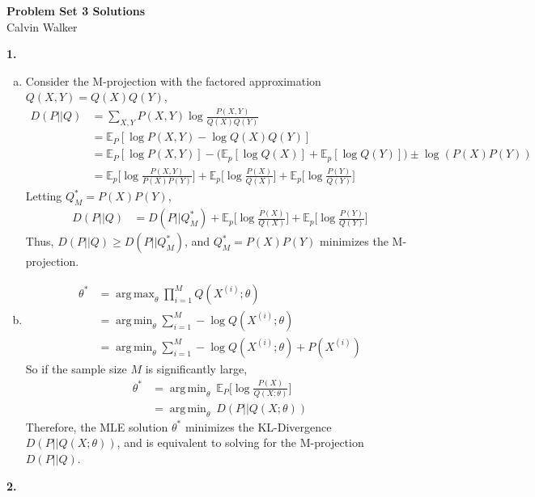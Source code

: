 \documentclass{article}
\DeclareMathOperator*{\argmax}{arg\,max}
\DeclareMathOperator*{\argmin}{arg\,min}
\begin{document}
\begin{center}
    \Large{\textbf{Problem Set 3 Solutions}} \\[0.25ex]
    Calvin Walker
\end{center}
\textbf{1.}
\begin{enumerate}[(a)]
    \item Consider the M-projection with the factored approximation $Q(X, Y) = Q(X)Q(Y)$, \begin{align*}
        D(P || Q) &= \sum_{X, Y} P(X, Y) \log \frac{P(X, Y)}{Q(X)Q(Y)} \\[0.5ex]
        &= \mathbb{E}_P[\log P(X, Y) - \log Q(X)Q(Y)] \\[0.5ex]
        &= \mathbb{E}_P[\log P(X, Y)] - \bigg(\mathbb{E}_p[\log Q(X)] + \mathbb{E}_p[\log Q(Y)]\bigg) \pm \log(P(X)P(Y)) \\[0.5ex]
        &= \mathbb{E}_p \bigg[\log \frac{P(X, Y)}{P(X)P(Y)}\bigg] + \mathbb{E}_p \bigg[\log \frac{P(X)}{Q(X)}\bigg] + \mathbb{E}_p \bigg[\log \frac{P(Y)}{Q(Y)}\bigg]
    \end{align*}
    Letting $Q^*_M = P(X)P(Y)$, \begin{align*}
        D(P || Q) &= D(P || Q^*_M) + \mathbb{E}_p \bigg[\log \frac{P(X)}{Q(X)}\bigg] + \mathbb{E}_p \bigg[\log \frac{P(Y)}{Q(Y)}\bigg]
    \end{align*}
    Thus, $D(P || Q) \geq D(P || Q^*_M)$, and $Q^*_M = P(X)P(Y)$ minimizes the M-projection. 
    \item \begin{align*}
        \theta^* &= \argmax_\theta \prod_{i = 1}^{M}Q(X^{(i)} ; \theta) \\[0.5ex]
        &= \argmin_\theta \sum_{i = 1}^{M} - \log Q(X^{(i)} ; \theta) \\[0.5ex]
        &= \argmin_\theta \sum_{i = 1}^{M} - \log Q(X^{(i)} ; \theta) + P(X^{(i)})
    \end{align*}
    So if the sample size $M$ is significantly large, \begin{align*}
        \theta^* &=  \argmin_\theta \ \mathbb{E}_P \bigg[\log \frac{P(X)}{Q(X ; \theta)} \bigg] \\[0.75ex]
        &= \argmin_\theta \ D(P || Q(X ; \theta))
    \end{align*}
    Therefore, the MLE solution $\theta^*$ minimizes the KL-Divergence $D(P || Q(X ; \theta))$, and is equivalent to solving for the M-projection $D(P||Q)$. 
\end{enumerate}
\textbf{2.} 
\end{document}
